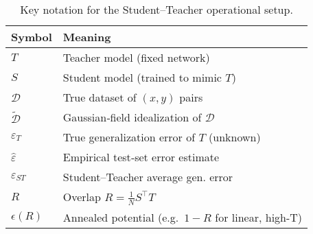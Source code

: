 \begin{table}[h]
\centering
\small
\begin{tabular}{@{}ll@{}}
\toprule
\textbf{Symbol} & \textbf{Meaning} \\
\midrule
$T$                      & Teacher model (fixed network) \\
$S$                      & Student model (trained to mimic $T$) \\
$\mathcal D$             & True dataset of $(x,y)$ pairs \\
$\widetilde{\mathcal D}$ & Gaussian‐field idealization of $\mathcal D$ \\
$\varepsilon_T$          & True generalization error of $T$ (unknown) \\
$\widehat\varepsilon$    & Empirical test‐set error estimate \\
$\varepsilon_{ST}$       & Student–Teacher average gen. error \\
$R$                      & Overlap $\displaystyle R=\tfrac{1}{N}S^\top T$ \\
$\epsilon(R)$            & Annealed potential (e.g.\ $1-R$ for linear, high-T) \\
\bottomrule
\end{tabular}
\caption{Key notation for the Student–Teacher operational setup.}
\label{tab:st_notation}
\end{table}
